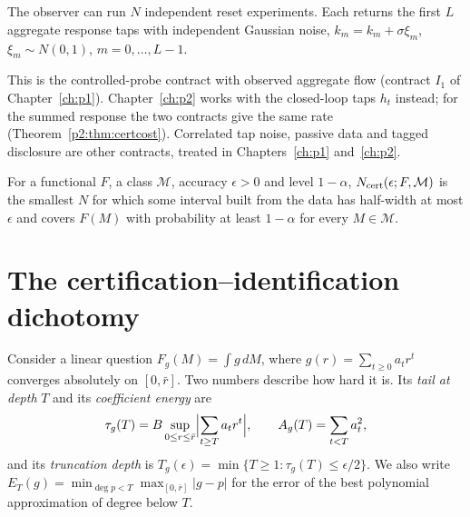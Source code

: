 \begin{assumption}\label{ass:reset}
The observer can run $N$ independent reset experiments. Each returns the first $L$ aggregate response taps with independent Gaussian noise, $\hat k_m=k_m+\sigma\xi_m$, $\xi_m\sim N(0,1)$, $m=0,\dots,L-1$.
\end{assumption}

This is the controlled-probe contract with observed aggregate flow (contract $I_1$ of Chapter~\ref{ch:p1}). Chapter~\ref{ch:p2} works with the closed-loop taps $h_t$ instead; for the summed response the two contracts give the same rate (Theorem~\ref{p2:thm:certcost}). Correlated tap noise, passive data and tagged disclosure are other contracts, treated in Chapters~\ref{ch:p1} and~\ref{ch:p2}.

\begin{definition}\label{def:ncert}
For a functional $F$, a class $\mathcal M$, accuracy $\epsilon>0$ and level $1-\alpha$, $N_{\rm cert}(\epsilon;F,\mathcal M)$ is the smallest $N$ for which some interval built from the data has half-width at most $\epsilon$ and covers $F(M)$ with probability at least $1-\alpha$ for every $M\in\mathcal M$.
\end{definition}

\section{The certification--identification dichotomy}\label{sec:fw_dich}

Consider a linear question $F_g(M)=\int g\,dM$, where $g(r)=\sum_{t\ge0}a_t r^t$ converges absolutely on $[0,\bar r]$. Two numbers describe how hard it is. Its \emph{tail at depth} $T$ and its \emph{coefficient energy} are
\[
\tau_g(T)=B\sup_{0\le r\le\bar r}\Bigl|\sum_{t\ge T}a_t r^t\Bigr|,\qquad A_g(T)=\sum_{t<T}a_t^2,
\]
and its \emph{truncation depth} is $T_g(\epsilon)=\min\{T\ge1:\tau_g(T)\le\epsilon/2\}$. We also write $E_T(g)=\min_{\deg p<T}\max_{[0,\bar r]}|g-p|$ for the error of the best polynomial approximation of degree below $T$.

